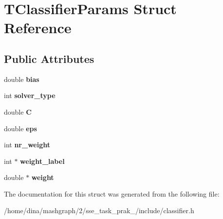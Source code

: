 \hypertarget{struct_t_classifier_params}{\section{T\-Classifier\-Params Struct Reference}
\label{struct_t_classifier_params}
}
\subsection*{Public Attributes}
\begin{DoxyCompactItemize}
\item 
\hypertarget{struct_t_classifier_params_aeed47b592e56000e578d4773f6008d11}{double {\bfseries bias}}\label{struct_t_classifier_params_aeed47b592e56000e578d4773f6008d11}

\item 
\hypertarget{struct_t_classifier_params_a0f44a5c17f235e049bff3a5d8a153967}{int {\bfseries solver\-\_\-type}}\label{struct_t_classifier_params_a0f44a5c17f235e049bff3a5d8a153967}

\item 
\hypertarget{struct_t_classifier_params_a5e862b5b6b8780d69b977adfcf5a959b}{double {\bfseries C}}\label{struct_t_classifier_params_a5e862b5b6b8780d69b977adfcf5a959b}

\item 
\hypertarget{struct_t_classifier_params_ae7669cd7922d6636204727afd84887b3}{double {\bfseries eps}}\label{struct_t_classifier_params_ae7669cd7922d6636204727afd84887b3}

\item 
\hypertarget{struct_t_classifier_params_a84334f06e0db218465768a0b9cfc9c40}{int {\bfseries nr\-\_\-weight}}\label{struct_t_classifier_params_a84334f06e0db218465768a0b9cfc9c40}

\item 
\hypertarget{struct_t_classifier_params_adc328e45ab2fa3a8d2d65c74e13d61af}{int $\ast$ {\bfseries weight\-\_\-label}}\label{struct_t_classifier_params_adc328e45ab2fa3a8d2d65c74e13d61af}

\item 
\hypertarget{struct_t_classifier_params_af662866189a5f6372e7612a6ff1df4e7}{double $\ast$ {\bfseries weight}}\label{struct_t_classifier_params_af662866189a5f6372e7612a6ff1df4e7}

\end{DoxyCompactItemize}


The documentation for this struct was generated from the following file\-:\begin{DoxyCompactItemize}
\item 
/home/dina/mashgraph/2/sse\-\_\-task\-\_\-prak\-\_/include/classifier.\-h\end{DoxyCompactItemize}
